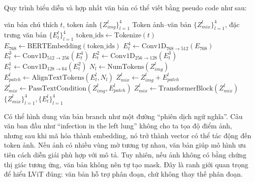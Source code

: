 Quy trình biểu diễn và hợp nhất văn bản có thể viết bằng pseudo code như sau:

\begin{algorithm}[H]
\caption{Mã hóa văn bản và hợp nhất ảnh--văn bản}
\label{alg:văn bản-fusion}
\begin{algorithmic}[1]
\Require văn bản chú thích \(t\), token ảnh \(\{Z_{img}^{l}\}_{l=1}^{4}\)
\Ensure Token ảnh--văn bản \(\{Z_{mix}^{l}\}_{l=1}^{4}\), đặc trưng văn bản \(\{E_t^l\}_{l=1}^{4}\)
\State \(\mathrm{token\_ids} \gets \mathrm{Tokenize}(t)\) 
\State \(E_{768} \gets \mathrm{BERTEmbedding}(\mathrm{token\_ids})\) 
\State \(E_t^4 \gets \mathrm{Conv1D}_{768\rightarrow512}(E_{768})\) 
\State \(E_t^3 \gets \mathrm{Conv1D}_{512\rightarrow256}(E_t^4)\) 
\State \(E_t^2 \gets \mathrm{Conv1D}_{256\rightarrow128}(E_t^3)\) 
\State \(E_t^1 \gets \mathrm{Conv1D}_{128\rightarrow64}(E_t^2)\) 
  \State \(N_l \gets \mathrm{NumTokens}(Z_{img}^{l})\) 
  \State \(E_{patch}^{l} \gets \mathrm{AlignTextTokens}(E_t^l,N_l)\) 
    \State \(Z_{mix}^{l} \gets Z_{img}^{l}+E_{patch}^{l}\) 
  \Else
    \State \(Z_{mix}^{l} \gets \mathrm{PassTextCondition}(Z_{img}^{l},E_{patch}^{l})\) 
  \EndIf
  \State \(Z_{mix}^{l} \gets \mathrm{TransformerBlock}(Z_{mix}^{l})\) 
\EndFor
\State \Return \(\{Z_{mix}^{l}\}_{l=1}^{4}, \{E_t^l\}_{l=1}^{4}\) 
\end{algorithmic}
\end{algorithm}



Có thể hình dung văn bản branch như một đường ``phiên dịch ngữ nghĩa''. Câu văn ban đầu như ``infection in the left lung'' không cho ta tọa độ điểm ảnh, nhưng sau khi mã hóa thành embedding, nó trở thành vector có thể tác động đến token ảnh. Nếu ảnh có nhiều vùng mờ tương tự nhau, văn bản giúp mô hình ưu tiên cách diễn giải phù hợp với mô tả. Tuy nhiên, nếu ảnh không có bằng chứng thị giác tương ứng, văn bản không nên tự tạo mask. Đây là ranh giới quan trọng để hiểu LViT đúng: văn bản hỗ trợ phân đoạn, chứ không thay thế phân đoạn.


